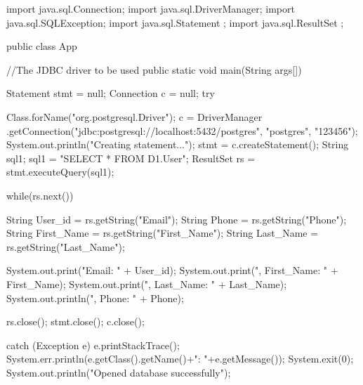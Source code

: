 import java.sql.Connection;
import java.sql.DriverManager;
import java.sql.SQLException;
import java.sql.Statement ;
import java.sql.ResultSet ;



public class App {
    //The JDBC driver to be used
    public static void main(String args[]) {
        Statement stmt = null;
        Connection c = null;
        try {
            Class.forName("org.postgresql.Driver");
            c = DriverManager
                    .getConnection("jdbc:postgresql://localhost:5432/postgres",
                            "postgres", "123456");
            System.out.println("Creating statement...");
            stmt = c.createStatement();
            String sql1;
            sql1 = "SELECT * FROM D1.User";
            ResultSet rs = stmt.executeQuery(sql1);

            while(rs.next()){
                String User_id  = rs.getString("Email");
                String Phone = rs.getString("Phone");
                String First_Name = rs.getString("First_Name");
                String Last_Name = rs.getString("Last_Name");

                System.out.print("Email: " + User_id);
                System.out.print(", First_Name: " + First_Name);
                System.out.print(", Last_Name: " + Last_Name);
                System.out.println(", Phone: " + Phone);
            }
            rs.close();
            stmt.close();
            c.close();
        } catch (Exception e) {
            e.printStackTrace();
            System.err.println(e.getClass().getName()+": "+e.getMessage());
            System.exit(0);
        }
        System.out.println("Opened database successfully");
    }
}
